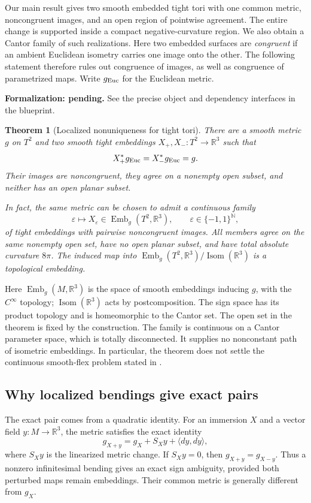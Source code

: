 \documentclass[11pt]{amsart}
\newtheorem{theorem}{Theorem}[section]
\theoremstyle{definition}
\theoremstyle{remark}
\newcommand{\R}{\mathbb R}\newcommand{\Sph}{\mathbb S}
\DeclareMathOperator{\Isom}{Isom}\DeclareMathOperator{\Emb}{Emb}
\numberwithin{equation}{section}
\begin{document}
Our main result gives two smooth embedded tight tori with one common
metric, noncongruent images, and an open region of pointwise agreement.
The entire change is supported inside a compact negative-curvature
region. We also obtain a Cantor family of such realizations.
Here two embedded surfaces are \emph{congruent} if an ambient Euclidean
isometry carries one image onto the other. The following statement therefore
rules out congruence of images, as well as congruence of parametrized maps.
Write $g_{\rm Euc}$ for the Euclidean metric.

\par\noindent\textbf{Formalization: pending.} See the precise object and dependency interfaces in the blueprint.\par
\begin{theorem}[Localized nonuniqueness for tight tori]\label{thm:main-fiber}
There are a smooth metric $g$ on $T^2$ and two smooth tight embeddings
$X_+,X_-:T^2\to\R^3$ such that
\[
 X_+^*g_{\rm Euc}=X_-^*g_{\rm Euc}=g.
\]
Their images are noncongruent, they agree on a nonempty open subset, and
neither has an open planar subset.

In fact, the same metric can be chosen to admit a continuous family
\[
 \varepsilon\longmapsto X_\varepsilon\in\Emb_g(T^2,\R^3),
 \qquad \varepsilon\in\{-1,1\}^{\mathbb N},
\]
of tight embeddings with pairwise noncongruent images. All members agree
on the same nonempty open set, have no open planar subset, and have total
absolute curvature $8\pi$. The induced map into
$\Emb_g(T^2,\R^3)/\Isom(\R^3)$ is a topological embedding.
\end{theorem}

Here $\Emb_g(M,\R^3)$ is the space of smooth embeddings inducing $g$, with
the $C^\infty$ topology; $\Isom(\R^3)$ acts by postcomposition. The sign
space has its product topology and is homeomorphic to the Cantor set.
The open set in the theorem is fixed by the construction. The family
is continuous on a Cantor parameter space, which is totally disconnected.
It supplies no nonconstant path of isometric embeddings. In particular,
the theorem does not settle the continuous smooth-flex problem stated
in \cite[Problem~1.1]{GhomiProblems}.

\subsection{Why localized bendings give exact pairs}
The exact pair comes from a quadratic identity. For an immersion $X$ and a vector
field $y:M\to\R^3$, the metric satisfies the exact identity
\begin{equation}\label{eq:intro-quadratic}
 g_{X+y}=g_X+S_Xy+\langle dy,dy\rangle,
\end{equation}
where $S_Xy$ is the linearized metric change. If $S_Xy=0$, then
$g_{X+y}=g_{X-y}$. Thus a nonzero infinitesimal bending gives an exact
sign ambiguity, provided both perturbed maps remain embeddings. Their
common metric is generally different from $g_X$.
\end{document}
